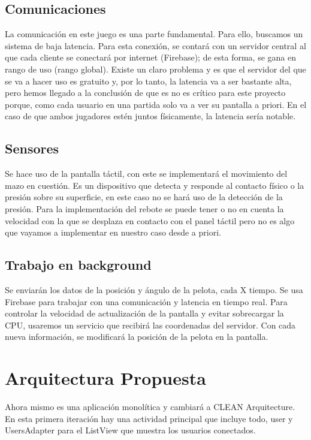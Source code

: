 \documentclass[a4paper,openright,12pt]{article}
\begin{document}
\subsection{Comunicaciones}
La comunicación en este juego es una parte fundamental. Para ello, buscamos un sistema de baja latencia. Para esta conexión, se contará con un servidor central al que cada cliente se conectará por internet (Firebase); de esta forma, se gana en rango de uso (rango global). Existe un claro problema y es que el servidor del que se va a hacer uso es gratuito y, por lo tanto, la latencia va a ser bastante alta, pero hemos llegado a la conclusión de que es no es crítico para este proyecto porque, como cada usuario en una partida solo va a ver su pantalla a priori. En el caso de que ambos jugadores estén juntos físicamente, la latencia sería notable.

\subsection{Sensores}
Se hace uso de la pantalla táctil, con este se implementará el movimiento del mazo en cuestión. Es un dispositivo que detecta y responde al contacto físico o la presión sobre su superficie, en este caso no se hará uso de la detección de la presión. Para la implementación del rebote se puede tener o no en cuenta la velocidad con la que se desplaza en contacto con el panel táctil pero no es algo que vayamos a implementar en nuestro caso desde a priori.
\subsection{Trabajo en background}
Se enviarán los datos de la posición y ángulo de la pelota, cada X tiempo. Se usa Firebase para trabajar con una comunicación y latencia en tiempo real. Para controlar la velocidad de actualización de la pantalla y evitar sobrecargar la CPU, usaremos un servicio que recibirá las coordenadas del servidor. Con cada nueva información, se modificará la posición de la pelota en la pantalla.

\section{Arquitectura Propuesta}
Ahora mismo es una aplicación monolítica y cambiará a CLEAN Arquitecture. En esta primera iteración hay una actividad principal que incluye todo, user y UsersAdapter para el ListView que muestra los usuarios conectados. 
\end{document}
